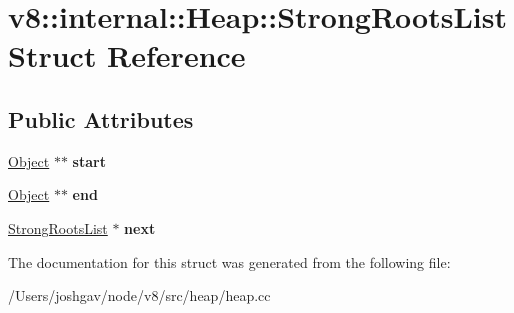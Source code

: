\hypertarget{structv8_1_1internal_1_1_heap_1_1_strong_roots_list}{}\section{v8\+:\+:internal\+:\+:Heap\+:\+:Strong\+Roots\+List Struct Reference}
\label{structv8_1_1internal_1_1_heap_1_1_strong_roots_list}
\subsection*{Public Attributes}
\begin{DoxyCompactItemize}
\item 
\hyperlink{classv8_1_1internal_1_1_object}{Object} $\ast$$\ast$ {\bfseries start}\hypertarget{structv8_1_1internal_1_1_heap_1_1_strong_roots_list_a98a9b2af69859a4dd90059c2975b5cda}{}\label{structv8_1_1internal_1_1_heap_1_1_strong_roots_list_a98a9b2af69859a4dd90059c2975b5cda}

\item 
\hyperlink{classv8_1_1internal_1_1_object}{Object} $\ast$$\ast$ {\bfseries end}\hypertarget{structv8_1_1internal_1_1_heap_1_1_strong_roots_list_a3a7b32ceffd9430044d74bdf63752a2e}{}\label{structv8_1_1internal_1_1_heap_1_1_strong_roots_list_a3a7b32ceffd9430044d74bdf63752a2e}

\item 
\hyperlink{structv8_1_1internal_1_1_heap_1_1_strong_roots_list}{Strong\+Roots\+List} $\ast$ {\bfseries next}\hypertarget{structv8_1_1internal_1_1_heap_1_1_strong_roots_list_a4e243194db91e2263c26cbae74d88462}{}\label{structv8_1_1internal_1_1_heap_1_1_strong_roots_list_a4e243194db91e2263c26cbae74d88462}

\end{DoxyCompactItemize}


The documentation for this struct was generated from the following file\+:\begin{DoxyCompactItemize}
\item 
/\+Users/joshgav/node/v8/src/heap/heap.\+cc\end{DoxyCompactItemize}
